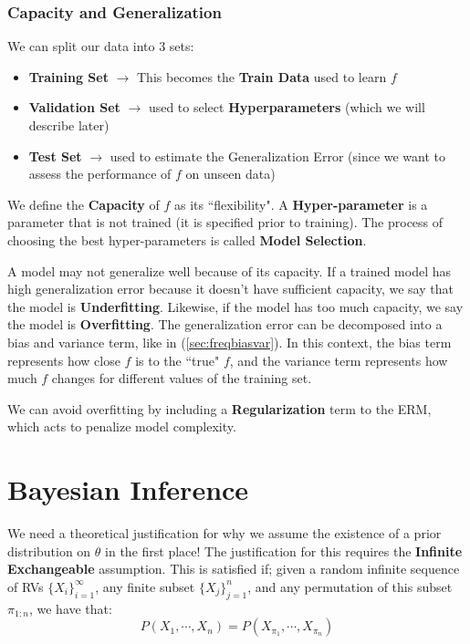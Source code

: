 \documentclass[]{article}
\theoremstyle{mattstyle}
\theoremstyle{definition}
\begin{document}
\subsubsection{Capacity and Generalization}

We can split our data into 3 sets: 
\begin{itemize}
	\item \textbf{Training Set} $\rightarrow$ This becomes the \textbf{Train Data} used to learn $f$
	\item \textbf{Validation Set} $\rightarrow$ used to select \textbf{Hyperparameters} (which we will describe later)
	\item \textbf{Test Set} $\rightarrow$ used to estimate the Generalization Error (since we want to assess the performance of $f$ on unseen data)
\end{itemize} 
We define the \textbf{Capacity} of $f$ as its ``flexibility". A \textbf{Hyper-parameter} is a parameter that is not trained (it is specified prior to training). The process of choosing the best hyper-parameters is called \textbf{Model Selection}.

A model may not generalize well because of its capacity. If a trained model has high generalization error because it doesn't have sufficient capacity, we say that the model is \textbf{Underfitting}. Likewise, if the model has too much capacity, we say the model is \textbf{Overfitting}. The generalization error can be decomposed into a bias and variance term, like in (\ref{sec:freqbiasvar}). In this context, the bias term represents how close $f$ is to the ``true" $f$, and the variance term represents how much $f$ changes for different values of the training set.

We can avoid overfitting by including a \textbf{Regularization} term to the ERM, which acts to penalize model complexity.

\newpage

\section{Bayesian Inference}

We need a theoretical justification for why we assume the existence of a prior distribution on \(\theta\) in the first place! The justification for this requires the \textbf{Infinite Exchangeable} assumption. This is satisfied if; given a random infinite sequence of RVs \( \{X_i\}_{i=1}^{\infty}\), any finite subset \(\{X_j\}_{j=1}^{n}\), and any permutation of this subset \(\pi_{1:n}\), we have that:
\begin{equation}
P(X_1, \cdots, X_n) = P(X_{\pi_1}, \cdots, X_{\pi_n})
\end{equation}
\end{document}
